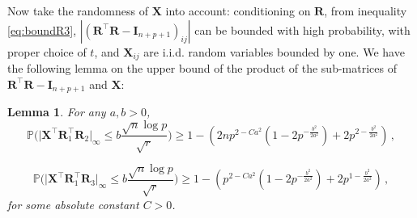 \documentclass[11pt]{article}
\newtheorem{lemma}{Lemma}%
\newcommand{\bX}{\boldsymbol{X}}
\newcommand{\bI}{\boldsymbol{I}}
\newcommand{\bR}{\boldsymbol{R}}
\newcommand{\Prob}{\mathbb{P}}
\begin{document}
Now take the randomness of $\bX$ into account: conditioning on $\bR$, from inequality \eqref{eq:boundR3}, $|(\bR^\top\bR-\bI_{n+p+1})_{ij}|$ can be bounded with high probability, with proper choice of $t$, and $\bX_{ij}$ are i.i.d. random variables bounded by one. We have the following lemma on the upper bound of the product of the sub-matrices of $\bR^\top\bR-\bI_{n+p+1}$ and $\bX$:

\begin{lemma}\label{lemma:boundXR}
    For any $a,b>0$, 
    \begin{equation}\label{eq:boundXR1}
        \Prob\bigg(\big|\bX^\top \bR_1^\top \bR_2\big|_\infty \leq b\frac{\sqrt{n}\log p}{\sqrt{r}} \bigg)\geq 1-\left(2np^{2-Ca^2}(1-2p^{-\frac{b^2}{2a^2}})+2p^{2-\frac{b^2}{2a^2}}\right)\,,
    \end{equation}
    
    \begin{equation}\label{eq:boundXR2}
        \Prob\bigg(\big|\bX^\top \bR_1^\top \bR_3\big|_\infty \leq b\frac{\sqrt{n}\log p}{\sqrt{r}} \bigg)\geq 1-\left(p^{2-Ca^2}(1-2p^{-\frac{b^2}{2a^2}})+2p^{1-\frac{b^2}{2a^2}}\right)\,,
    \end{equation}
    for some absolute constant $C>0$.
\end{lemma}
\end{document}
